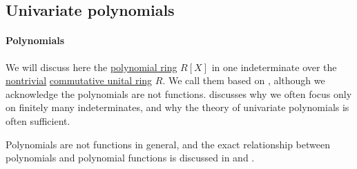 \subsection{Univariate polynomials}\label{subsec:univariate_polynomials}

\paragraph{Polynomials}

We will discuss here the \hyperref[def:polynomial_algebra]{polynomial ring} \( R[X] \) in one indeterminate over the \hyperref[def:ring/trivial]{nontrivial} \hyperref[def:ring/commutative]{commutative unital ring} \( R \). We call them  based on , although we acknowledge the polynomials are not functions.  discusses why we often focus only on finitely many indeterminates, and why the theory of univariate polynomials is often sufficient.

Polynomials are not functions in general, and the exact relationship between polynomials and polynomial functions is discussed in  and .


